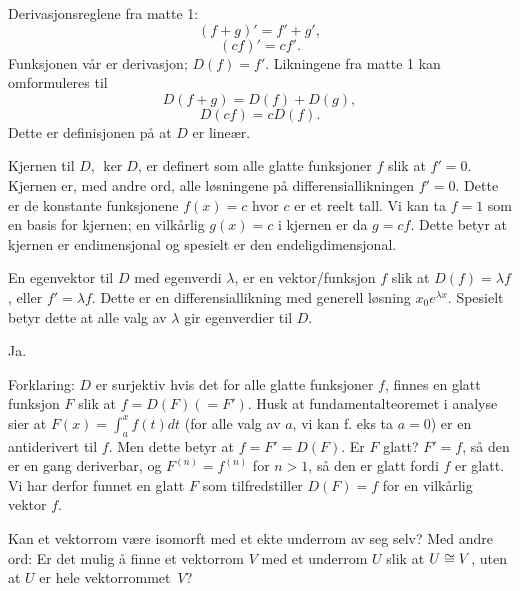 \begin{losning}

\begin{punkt}
Derivasjonsreglene fra matte 1: 
$$(f+g)'=f'+g',$$ $$(cf)'=cf'.$$ Funksjonen vår er derivasjon; $D(f)=f'$. Likningene fra matte 1 kan omformuleres til $$D(f+g)=D(f)+D(g),$$ $$D(cf)=cD(f).$$ Dette er definisjonen på at $D$ er lineær.
\end{punkt}

\begin{punkt}
Kjernen til $D$, $\ker D$, er definert som alle glatte funksjoner $f$ slik at $f'=0$. Kjernen er, med andre ord, alle løsningene på differensiallikningen $f'=0$. Dette er de konstante funksjonene $f(x)=c$ hvor $c$ er et reelt tall. Vi kan ta $f=1$ som en basis for kjernen; en vilkårlig $g(x)=c$ i kjernen er da $g=cf$. Dette betyr at kjernen er endimensjonal og spesielt er den endeligdimensjonal.
\end{punkt}

\begin{punkt}
En egenvektor til $D$ med egenverdi $\lambda$, er en vektor/funksjon $f$ slik at $D(f)=\lambda f$, eller $f'=\lambda f$. Dette er en differensiallikning med generell løsning $x_0e^{\lambda x}$. Spesielt betyr dette at alle valg av $\lambda$ gir egenverdier til $D$.
\end{punkt}

\begin{punkt}
Ja.

\noindent
Forklaring: $D$ er surjektiv hvis det for alle glatte funksjoner $f$, finnes en glatt funksjon $F$ slik at $f=D(F)(=F')$. Husk at fundamentalteoremet i analyse sier at $F(x)=\int_a^x f(t)dt$ (for alle valg av $a$, vi kan f. eks ta $a=0$) er en antiderivert til $f$. Men dette betyr at $f=F'=D(F)$. Er $F$ glatt? $F'=f$, så den er en gang deriverbar, og $F^{(n)}=f^{(n)}$ for $n>1$, så den er glatt fordi $f$ er glatt. Vi har derfor funnet en glatt $F$ som tilfredstiller $D(F)=f$ for en vilkårlig vektor $f$.
\end{punkt}

\end{losning}


\begin{oppgave}
Kan et vektorrom være isomorft med et ekte underrom av seg selv?
Med andre ord: 
Er det mulig å finne et vektorrom $V$ med et underrom $U$
slik at $U \cong V$, uten at $U$  er hele vektorrommet~$V$?
\end{oppgave}

